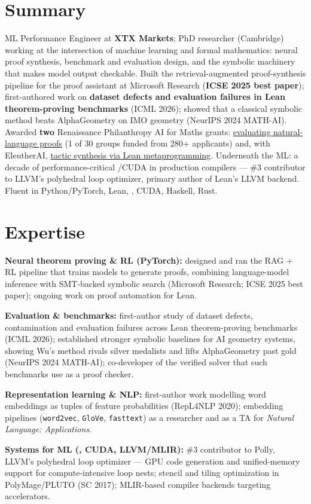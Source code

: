 \documentclass[9pt,a4paper]{extarticle}
\begin{document}
\cvheader

\section{Summary}
ML Performance Engineer at \textbf{XTX Markets}; PhD researcher (Cambridge) working at the intersection of machine learning and formal
mathematics: neural proof synthesis, benchmark and evaluation design, and the symbolic
machinery that makes model output checkable.
Built the retrieval-augmented proof-synthesis pipeline for the \fstar{} proof assistant at
Microsoft Research (\textbf{ICSE 2025 best paper}); first-authored work on
\textbf{dataset defects and evaluation failures in Lean theorem-proving benchmarks}
(ICML 2026); showed that a classical symbolic method beats AlphaGeometry on IMO geometry
(NeurIPS 2024 MATH-AI).
Awarded \textbf{two} Renaissance Philanthropy AI for Maths grants:
\href{https://www.renaissancephilanthropy.org/mathbench-towards-evaluating-natural-language-proofs}{evaluating natural-language proofs}
(1 of 30 groups funded from 280+ applicants) and, with EleutherAI,
\href{https://www.renaissancephilanthropy.org/tactic-synthesis-via-lean-metaprogramming-towards-self-improving-theorem-provers}{tactic synthesis via Lean metaprogramming}.
Underneath the ML: a decade of performance-critical \cpp{}/CUDA in production compilers ---
\#3 contributor to LLVM's polyhedral loop optimizer, primary author of Lean's LLVM backend.
Fluent in Python/PyTorch, Lean, \cpp{}, CUDA, Haskell, Rust.

\section{Expertise}
\begin{records}
\item \textbf{Neural theorem proving \& RL (PyTorch):} designed and ran the RAG + RL pipeline
that trains models to generate \fstar{} proofs, combining language-model inference with
SMT-backed symbolic search (Microsoft Research; ICSE 2025 best paper); ongoing work on proof
automation for Lean.
\item \textbf{Evaluation \& benchmarks:} first-author study of dataset defects, contamination
and evaluation failures across Lean theorem-proving benchmarks (ICML 2026); established
stronger symbolic baselines for AI geometry systems, showing Wu's method rivals silver
medalists and lifts AlphaGeometry past gold (NeurIPS 2024 MATH-AI); co-developer of the verified
solver that such benchmarks use as a proof checker.
\item \textbf{Representation learning \& NLP:} first-author work modelling word embeddings as
tuples of feature probabilities (RepL4NLP 2020); embedding pipelines (\texttt{word2vec},
\texttt{GloVe}, \texttt{fasttext}) as a researcher and as a TA for \emph{Natural Language:
Applications}.
\item \textbf{Systems for ML (\cpp{}, CUDA, LLVM/MLIR):} \#3 contributor to Polly, LLVM's
polyhedral loop optimizer --- GPU code generation and unified-memory support for
compute-intensive loop nests; stencil and tiling optimization in PolyMage/PLUTO (SC 2017);
MLIR-based compiler backends targeting accelerators.
\end{records}
\end{document}
